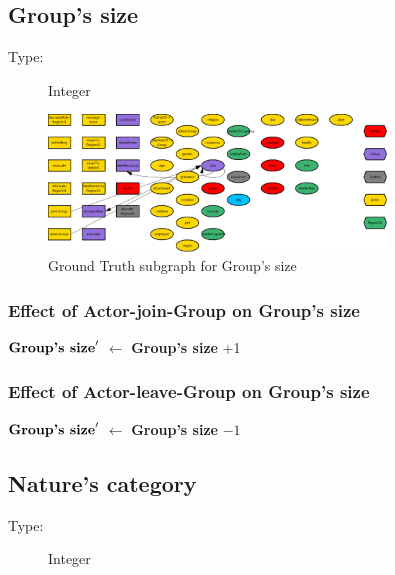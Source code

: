 \documentclass{article}%
\begin{document}
%
\subsection{Group's size}%
\label{subsec:Group's size}%
\begin{description}%
\item[Type:]%
Integer%
\end{description}%


\begin{figure}[ht]%
\centering%
\includegraphics[width=0.8\textwidth]{images/sizeOfGroup.png}%
\caption{Ground Truth subgraph for Group's size}%
\end{figure}

%
\subsubsection{Effect of Actor{-}join{-}Group on Group's size}%
\label{ssubsec:Effect of Actor{-}join{-}Group on Group's size}%
\begin{flushleft}%
$\mbox{\textbf{Group's size}} '$%
$\leftarrow$%
\textbf{Group's size}%
+1%
\end{flushleft}

%
\subsubsection{Effect of Actor{-}leave{-}Group on Group's size}%
\label{ssubsec:Effect of Actor{-}leave{-}Group on Group's size}%
\begin{flushleft}%
$\mbox{\textbf{Group's size}} '$%
$\leftarrow$%
\textbf{Group's size}%
${-}1$%
\end{flushleft}

%
\subsection{Nature's category}%
\label{subsec:Nature's category}%
\begin{description}%
\item[Type:]%
Integer%
\end{description}%
\end{document}
